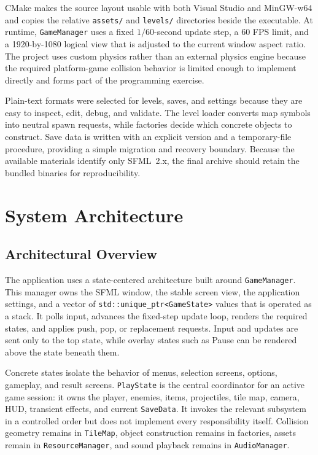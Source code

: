 \documentclass{template}
\begin{document}
CMake makes the source layout usable with both Visual Studio and MinGW-w64 and
copies the relative \texttt{assets/} and \texttt{levels/} directories beside
the executable. At runtime, \texttt{GameManager} uses a fixed $1/60$-second
update step, a 60 FPS limit, and a 1920-by-1080 logical view that is adjusted to
the current window aspect ratio. The project uses custom physics rather than an
external physics engine because the required platform-game collision behavior
is limited enough to implement directly and forms part of the programming
exercise.

Plain-text formats were selected for levels, saves, and settings because they
are easy to inspect, edit, debug, and validate. The level loader converts map
symbols into neutral spawn requests, while factories decide which concrete
objects to construct. Save data is written with an explicit version and a
temporary-file procedure, providing a simple migration and recovery boundary.
Because the available materials identify only SFML~2.x, the final archive
should retain the bundled binaries for reproducibility.

\clearpage
\section{System Architecture}

\subsection{Architectural Overview}

The application uses a state-centered architecture built around
\texttt{GameManager}. This manager owns the SFML window, the stable screen
view, the application settings, and a vector of
\texttt{std::unique\_ptr<GameState>} values that is operated as a stack. It
polls input, advances the fixed-step update loop, renders the required states,
and applies push, pop, or replacement requests. Input and updates are sent only
to the top state, while overlay states such as Pause can be rendered above the
state beneath them.

Concrete states isolate the behavior of menus, selection screens, options,
gameplay, and result screens. \texttt{PlayState} is the central coordinator for
an active game session: it owns the player, enemies, items, projectiles, tile
map, camera, HUD, transient effects, and current \texttt{SaveData}. It invokes
the relevant subsystem in a controlled order but does not implement every
responsibility itself. Collision geometry remains in \texttt{TileMap}, object
construction remains in factories, assets remain in \texttt{ResourceManager},
and sound playback remains in \texttt{AudioManager}.
\end{document}
